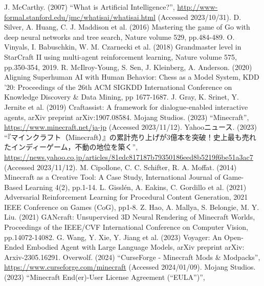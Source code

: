 \begin{thebibliography}{99}
    J. McCarthy. (2007) 
    ``What is Artificial Intelligence?'', 
    \url{http://www-formal.stanford.edu/jmc/whatisai/whatisai.html} (Accessed 2023/10/31).
    D. Silver, A. Huang, C. J. Maddison et al. (2016) 
    Mastering the game of Go with deep neural networks and tree search, 
    Nature volume 529, pp.484-489.
    O. Vinyals, I. Babuschkin, W. M. Czarnecki et al. (2018) 
    Grandmaster level in StarCraft II using multi-agent reinforcement learning, 
    Nature volume 575, pp.350-354, 2019.
    R. McIlroy-Young, S. Sen, J. Kleinberg, A. Anderson. (2020) 
    Aligning Superhuman AI with Human Behavior: Chess as a Model System,
    KDD '20: Proceedings of the 26th ACM SIGKDD International Conference on Knowledge Discovery \& Data Mining, pp 1677-1687.
    J. Gray, K. Srinet, Y. Jernite et al. (2019) 
    Craftassist: A framework for dialogue-enabled interactive agents,
    arXiv preprint arXiv:1907.08584.
    Mojang Studios. (2023)
    ``Minecraft'', 
    \url{https://www.minecraft.net/ja-jp} (Accessed 2023/11/12).
    Yahooニュース. (2023)
    ``『マインクラフト（Minecraft）』の累計売り上げが3億本を突破！史上最も売れたインディーゲーム，不動の地位を築く'',
    \url{https://news.yahoo.co.jp/articles/81edc817187b79350186eed8b5219f6be51a3ac7} (Accessed 2023/11/12).
	M. Cipollone, C. C. Schifter, R. A. Moffat. (2014) 
    Minecraft as a Creative Tool: A Case Study, 
    International Journal of Game-Based Learning 4(2), pp.1-14.
	L. Gisslén, A. Eakins, C. Gordillo et al. (2021)
    Adversarial Reinforcement Learning for Procedural Content Generation,
    2021 IEEE Conference on Games (CoG), pp1-8.
	Z. Hao, A. Mallya, S. Belongie, M. Y. Liu. (2021) 
    GANcraft: Unsupervised 3D Neural Rendering of Minecraft Worlds, 
    Proceedings of the IEEE/CVF International Conference on Computer Vision, pp.14072-14082.
    G. Wang, Y. Xie, Y. Jiang et al. (2023)
    Voyager: An Open-Ended Embodied Agent with Large Language Models, 
    arXiv preprint arXiv: Arxiv-2305.16291.
    Overwolf. (2024) 
    ``CurseForge - Minecraft Mods \& Modpacks'',
    \url{https://www.curseforge.com/minecraft} (Accessed 2024/01/09).
    Mojang Studios. (2023)
    ``Minecraft End(er)-User License Agreement (``EULA'')'',

\end{thebibliography}
